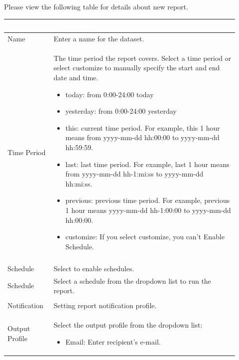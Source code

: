 \begin{description}
    \item[] Please view the following table for details about new report.
    \begin{longtable}{p{}|p{}}   
        \rowcolor{black}\multicolumn{1}{l!\vlinewhite}{\textcolor{white}{Field}}  & \textcolor{white}{Description} \\\hline                                                                                                                                                          
        Name & Enter a name for the dataset.\\\hline  
        Time Period & The time period the report covers. Select a time period or select customize to manually specify the start and end date and time.
                        \begin{itemize}
                            \item today: from 0:00-24:00 today
                            \item yesterday: from 0:00-24:00 yesterday
                            \item this: current time period. For example, this 1 hour means from yyyy-mm-dd hh:00:00 to yyyy-mm-dd hh:59:59.
                            \item last: last time period. For example, last 1 hour means from yyyy-mm-dd hh-1:mi:ss to yyyy-mm-dd hh:mi:ss.
                            \item previous: previous time period. For example, previous 1 hour means yyyy-mm-dd hh-1:00:00 to yyyy-mm-dd hh:00:00.
                            \item customize: If you select customize, you can’t Enable Schedule.
                        \end{itemize} \\\hline 
        \tabincell{l}{Enable\\ Schedule} & Select to enable schedules.\\\hline 
        Schedule & Select a schedule from the dropdown list to run the report.\\\hline
        \tabincell{l}{Enable\\ Notification} & Setting report notification profile.\\\hline
        Output Profile & Select the output profile from the dropdown list:
                        \begin{itemize}
                            \item Email: Enter recipient's e-mail.

\end{itemize}
\end{longtable}
\end{description}
